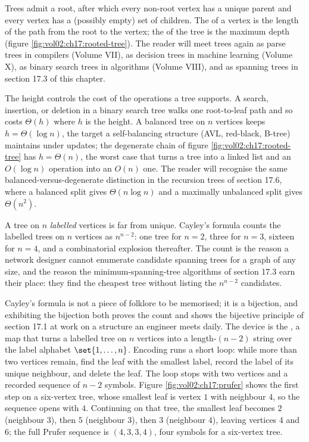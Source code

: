 Trees admit a root, after which every non-root vertex has a unique
parent and every vertex has a (possibly empty) set of children. The
 of a vertex is the length of the path from the root
to the vertex; the  of the tree is the maximum
depth (figure \ref{fig:vol02:ch17:rooted-tree}). The reader will
meet trees again as parse trees in compilers (Volume VII), as
decision trees in machine learning (Volume X), as binary search
trees in algorithms (Volume VIII), and as spanning trees in section
17.3 of this chapter.



The height controls the cost of the operations a tree supports. A
search, insertion, or deletion in a binary search tree walks one
root-to-leaf path and so costs $\Theta(h)$ where $h$ is the height.
A balanced tree on $n$ vertices keeps $h = \Theta(\log n)$, the
target a self-balancing structure (AVL, red-black, B-tree) maintains
under updates; the degenerate chain of figure
\ref{fig:vol02:ch17:rooted-tree} has $h = \Theta(n)$, the worst case
that turns a tree into a linked list and an $O(\log n)$ operation
into an $O(n)$ one. The reader will recognise the same
balanced-versus-degenerate distinction in the recursion trees of
section 17.6, where a balanced split gives $\Theta(n \log n)$ and a
maximally unbalanced split gives $\Theta(n^{2})$.

A tree on $n$ \emph{labelled} vertices is far from unique. Cayley's
formula counts the labelled trees on $n$ vertices as $n^{n-2}$: one
tree for $n = 2$, three for $n = 3$, sixteen for $n = 4$, and a
combinatorial explosion thereafter. The count is the reason a
network designer cannot enumerate candidate spanning trees for a
graph of any size, and the reason the minimum-spanning-tree
algorithms of section 17.3 earn their place: they find the cheapest
tree without listing the $n^{n-2}$ candidates.

Cayley's formula is not a piece of folklore to be memorised; it is a
bijection, and exhibiting the bijection both proves the count and shows
the bijective principle of section 17.1 at work on a structure an
engineer meets daily. The device is the , a
map that turns a labelled tree on $n$ vertices into a length-$(n-2)$
string over the label alphabet $\set{1, \ldots, n}$. Encoding runs a
short loop: while more than two vertices remain, find the leaf with the
smallest label, record the label of its unique neighbour, and delete
the leaf. The loop stops with two vertices and a recorded sequence of
$n - 2$ symbols. Figure \ref{fig:vol02:ch17:prufer} shows the first
step on a six-vertex tree, whose smallest leaf is vertex $1$ with
neighbour $4$, so the sequence opens with $4$. Continuing on that tree,
the smallest leaf becomes $2$ (neighbour $3$), then $5$ (neighbour
$3$), then $3$ (neighbour $4$), leaving vertices $4$ and $6$; the full
Prufer sequence is $(4, 3, 3, 4)$, four symbols for a six-vertex tree.

